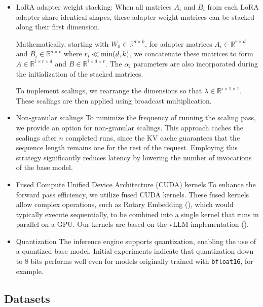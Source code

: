 \begin{itemize}
    \item LoRA adapter weight stacking: When all matrices $A_i$ and $B_i$ from each LoRA adapter share identical shapes, these adapter weight matrices can be stacked along their first dimension.

Mathematically, starting with $W_0 \in \mathbb{R}^{d \times k}$, for adapter matrices $A_i \in \mathbb{R}^{r \times d}$ and $B_i \in \mathbb{R}^{d \times r}$ where $r_i \ll {\rm min} (d,k)$, we concatenate these matrices to form $A \in \mathbb{R}^{i \times r \times d}$ and $B \in \mathbb{R}^{i \times d \times r}$. The $\alpha_i$ parameters are also incorporated during the initialization of the stacked matrices.

To implement scalings, we rearrange the dimensions so that $\lambda \in \mathbb{R}^{i \times 1 \times 1}$. These scalings are then applied using broadcast multiplication.

\item Non-granular scalings To minimize the frequency of running the scaling pass, we provide an option for non-granular scalings. This approach caches the scalings after $n$ completed runs, since the KV cache guarantees that the sequence length remains one for the rest of the request. Employing this strategy significantly reduces latency by lowering the number of invocations of the base model.

\item Fused Compute Unified Device Architecture (CUDA) kernels To enhance the forward pass efficiency, we utilize fused CUDA kernels. These fused kernels allow complex operations, such as Rotary Embedding (\cite{su2021roformer}), which would typically execute sequentially, to be combined into a single kernel that runs in parallel on a GPU. Our kernels are based on the vLLM implementation (\cite{kwon2023efficient}).

\item Quantization The inference engine supports quantization, enabling the use of a quantized base model. Initial experiments indicate that quantization down to 8 bits performs well even for models originally trained with \texttt{bfloat16}, for example.

\end{itemize}

\subsection{Datasets}

